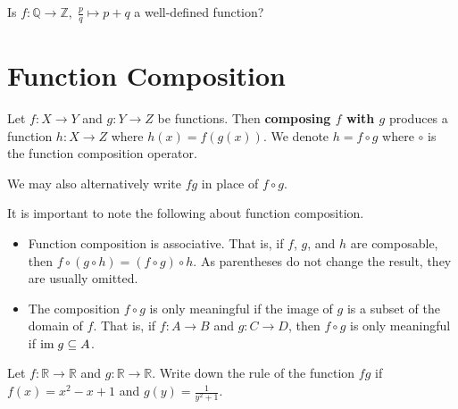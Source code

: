 \begin{exercise}
    Is $f: \mathbb{Q} \to \mathbb{Z},\;\frac pq \mapsto p + q$ a well-defined function?
\end{exercise}

\section{Function Composition}
\begin{definition}
    Let $f: X \to Y$ and $g: Y \to Z$ be functions. Then \textbf{composing $f$ with $g$} produces a function $h: X \to Z$ where $h(x) = f(g(x))$. We denote $h = f \circ g$ where $\circ$ is the function composition operator.
\end{definition}
\begin{remark}
    We may also alternatively write $fg$ in place of $f \circ g$.
\end{remark}

It is important to note the following about function composition.
\begin{itemize}
    \item Function composition is associative. That is, if $f$, $g$, and $h$ are composable, then $f \circ (g \circ h) = (f \circ g) \circ h$. As parentheses do not change the result, they are usually omitted.
    \item The composition $f \circ g$ is only meaningful if the image of $g$ is a subset of the domain of $f$. That is, if $f: A \to B$ and $g: C \to D$, then $f \circ g$ is only meaningful if $\mathrm{im}\; g \subseteq A$.
\end{itemize}

\begin{exercise}
    Let $f: \mathbb{R} \to \mathbb{R}$ and $g: \mathbb{R} \to \mathbb{R}$. Write down the rule of the function $fg$ if $f(x) = x^2 - x + 1$ and $g(y) = \frac1{y^2+1}$.
\end{exercise}


